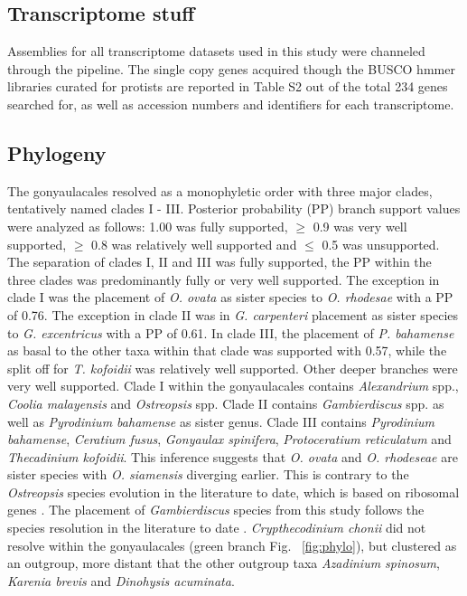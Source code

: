 \documentclass[12pt]{article}
\begin{document}
\subsection*{Transcriptome stuff}
Assemblies for all transcriptome datasets used in this study were channeled through the pipeline. 
The single copy genes acquired though the BUSCO hmmer libraries curated for protists are reported in Table S2 out of the total 234 genes searched for, as well as accession numbers and identifiers for each transcriptome.
\subsection*{Phylogeny}
The gonyaulacales resolved as a monophyletic order with three major clades, tentatively named clades I - III. 
Posterior probability (PP) branch support values were analyzed as follows: 1.00 was fully supported, $\geq$ 0.9 was very well supported, $\geq$ 0.8 was relatively well supported and $\leq$ 0.5 was unsupported.
The separation of clades I, II and III was fully supported, the PP within the three clades was predominantly fully or very well supported. 
The exception in clade I was the placement of \emph{O. ovata} as sister species to \emph{O. rhodesae} with a PP of 0.76. 
The exception in clade II was in \emph{G. carpenteri} placement as sister species to \emph{G. excentricus} with a PP of 0.61. In clade III, the placement of \emph{P. bahamense} as basal to the other taxa within that clade was supported with 0.57, while the split off for \emph{T. kofoidii} was relatively well supported.
Other deeper branches were very well supported.
Clade I within the gonyaulacales contains \emph{Alexandrium} spp., \emph{Coolia malayensis} and \emph{Ostreopsis} spp. 
Clade II contains \emph{Gambierdiscus} spp. as well as \emph{Pyrodinium bahamense} as sister genus. 
Clade III contains \emph{Pyrodinium bahamense}, \emph{Ceratium fusus}, \emph{Gonyaulax spinifera}, \emph{Protoceratium reticulatum} and \emph{Thecadinium kofoidii}. 
This inference suggests that \emph{O. ovata} and \emph{O. rhodeseae} are sister species with \emph{O. siamensis} diverging earlier. 
This is contrary to the \emph{Ostreopsis} species evolution in the literature to date, which is based on ribosomal genes \cite{verma2016molecular}. 
The placement of \emph{Gambierdiscus} species from this study follows the species resolution in the literature to date \cite{kretzschmar2017characterization}. 
\emph{Crypthecodinium chonii} did not resolve within the gonyaulacales (green branch Fig. ~\ref{fig:phylo}), but clustered as an outgroup, more distant that the other outgroup taxa \emph{Azadinium spinosum}, \emph{Karenia brevis} and \emph{Dinohysis acuminata}.
\end{document}
